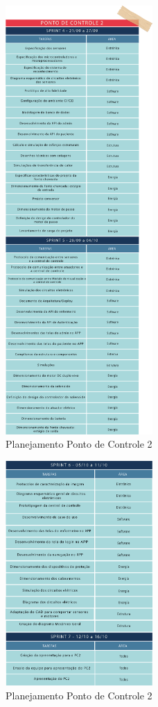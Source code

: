 \begin{apendicesenv}
\begin{figure}[H]
    \centering
    \includegraphics[width=0.5\textwidth]{figuras/sprint-pc2-1.png}
    \caption{Planejamento Ponto de Controle 2}
    \label{fig:Sprint_pc2}
\end{figure}

\begin{figure}[H]
    \centering
    \includegraphics[width=0.5\textwidth]{figuras/sprint-pc2-2.png}
    \caption{Planejamento Ponto de Controle 2}
    \label{fig:Sprint_pc2_1}
\end{figure}


\end{apendicesenv}
